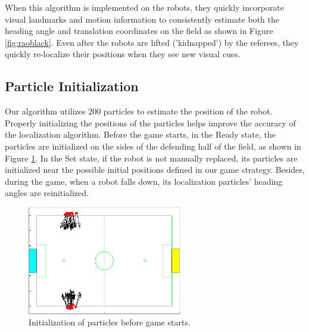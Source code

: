 \documentclass{article}
\begin{document}
	When this algorithm is implemented on the robots, they quickly incorporate visual landmarks and motion information to consistently estimate both the heading angle and translation coordinates on the field as shown in Figure \ref{fig:raoblack}. Even after the robots are lifted ('kidnapped') by the referees, they quickly re-localize their positions when they see new visual cues.	


  \subsection{Particle Initialization}
	  Our algorithm utilizes 200 particles to estimate the position of the robot. Properly initializing the positions of the particles helps improve the accuracy of the localization algorithm. Before the game starts, in the Ready state, the particles are initialized on the sides of the defending half of the field, as shown in Figure \ref{fig:Init}. In the Set state, if the robot is not manually replaced, its particles are initialized near the possible initial positions defined in our game strategy. Besides, during the game, when a robot falls down, its localization particles' heading angles are reinitialized.
    \begin{figure}[H]
      \centering
      \includegraphics[width=0.6\textwidth]{figures/InitParticles}    
      \caption{Initialization of particles before game starts.}
      \label{fig:Init}
    \end{figure}

		
\end{document}
